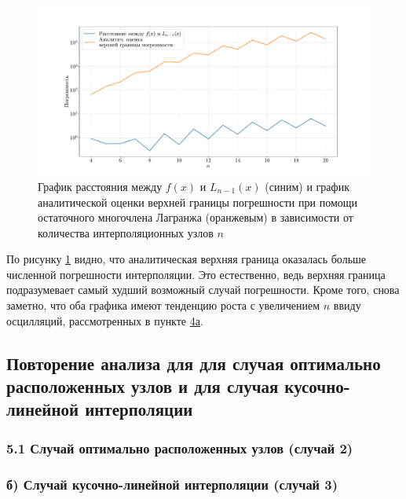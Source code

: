 \begin{figure}
    \centering
    \includegraphics[width=1\linewidth]{labs/approx_vs_analytic.pdf}
    \caption{График расстояния между $f(x)$ и $L_{n−1}(x)$ (синим) и график аналитической оценки верхней границы погрешности при помощи остаточного многочлена Лагранжа (оранжевым) в зависимости от количества интерполяционных узлов $n$}  
    \label{fig:fig3}
\end{figure}

По рисунку \ref{fig:fig3} видно, что аналитическая верхняя граница оказалась больше численной погрешности интерполяции. Это естественно, ведь верхняя граница подразумевает самый худший возможный случай погрешности. Кроме того, снова заметно, что оба графика имеют тенденцию роста с увеличением $n$ ввиду осцилляций, рассмотренных в пункте \hyperref[z4a]{4а}.

\subsection{Повторение анализа для для случая оптимально расположенных узлов и для случая кусочно-линейной интерполяции}

\subsubsection{5.1 Случай оптимально расположенных узлов (случай 2)}
\label{z5a}





\subsubsection{б) Случай кусочно-линейной интерполяции (случай 3)}
\label{z5b}


